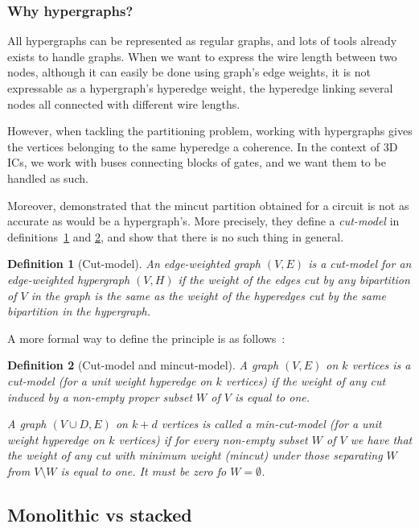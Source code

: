 \documentclass[12pt,a4paper]{article}
\theoremstyle{customdef}
\newtheorem{definition}{Definition}
\begin{document}
\subsubsection{Why hypergraphs?}
All hypergraphs can be represented as regular graphs, and lots of tools already exists to handle graphs.
When we want to express the wire length between two nodes, although it can easily be done using graph's edge weights, it is not expressable as a hypergraph's hyperedge weight, the hyperedge linking several nodes all connected with different wire lengths.

However, when tackling the partitioning problem, working with hypergraphs gives the vertices belonging to the same hyperedge a coherence.
In the context of 3D ICs, we work with buses connecting blocks of gates, and we want them to be handled as such.

Moreover, \citet{Ihler1993} demonstrated that the mincut partition obtained for a circuit is not as accurate as would be a hypergraph's.
More precisely, they define a \textit{cut-model} in definitions~\ref{def:cut-model} and \ref{def:cut-model-formal}, and show that there is no such thing in general.

\begin{definition}[Cut-model]\label{def:cut-model}
An edge-weighted graph $(V,E)$ is a cut-model for an edge-weighted hypergraph $(V,H)$ if the weight of the edges cut by any bipartition of $V$ in the graph is the same as the weight of the hyperedges cut by the same bipartition in the hypergraph.
\end{definition}

A more formal way to define the principle is as follows~:
\begin{definition}[Cut-model and mincut-model]\label{def:cut-model-formal}
A graph $(V, E)$ on $k$ vertices is a cut-model (for a unit weight hyperedge on $k$ vertices) if the weight of any cut induced by a non-empty proper subset $W$ of $V$ is equal to one.

A graph $(V \cup D,E)$ on $k+d$ vertices is called a min-cut-model (for a unit weight hyperedge on $k$ vertices) if for every non-empty subset $W$ of $V$ we have that the weight of any cut with minimum weight (mincut) under those separating $W$ from $V \setminus W$ is equal to one.
It must be zero fo $W=\emptyset$.%
\end{definition}

\subsection{Monolithic vs stacked}
\end{document}
